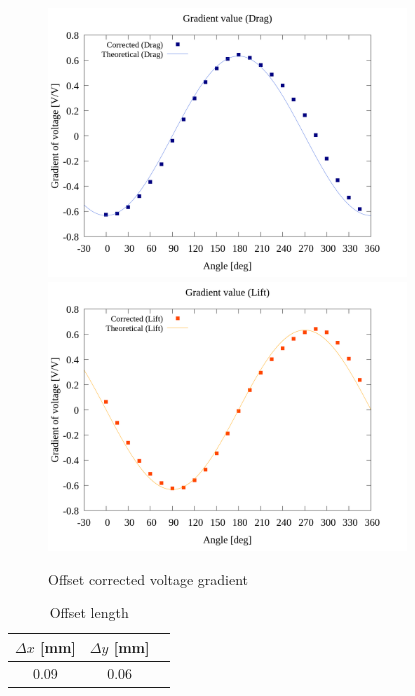 \begin{figure}[htbp]
		\centering
		\includegraphics[width=95mm]{../../02_workspace/result/2-ex/plot/21/21-2_corrected_offset_drag.png}
		\includegraphics[width=95mm]{../../02_workspace/result/2-ex/plot/21/21-2_corrected_offset_lift.png}
    \caption{Offset corrected voltage gradient}
\end{figure}

\begin{table}[htbp]
  \begin{center}
      \caption{Offset length}
      \begin{tabular}{|p{30mm}|p{20mm}|p{20mm}|}
          \hline
          \multicolumn{1}{|c|}{$\Delta x$ [mm]} & \multicolumn{1}{|c|}{$\Delta y$ [mm]} \\ \hline
          \multicolumn{1}{|c|}{0.09}           & \multicolumn{1}{|c|}{0.06}           \\ \hline
      \end{tabular}
  \end{center}
\end{table}

\newpage

